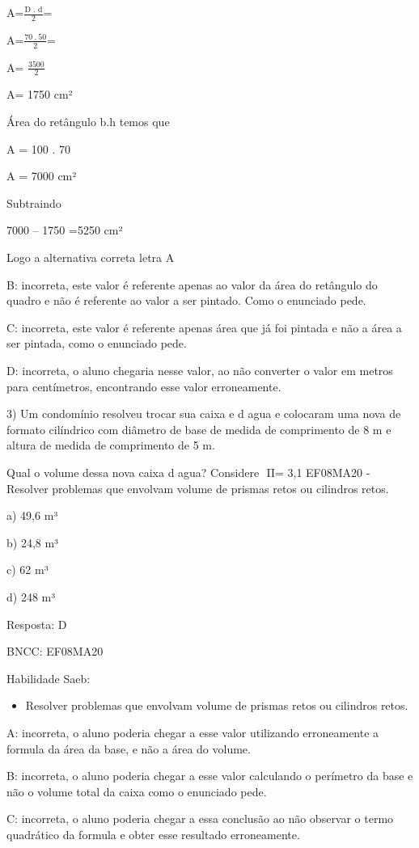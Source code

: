 A=\(\frac{\text{D\ .\ d}}{2}\)=

A=\(\frac{70\ .\ 50}{2}\)=

A= \(\frac{3500}{2}\)

A= 1750 cm²

Área do retângulo b.h temos que

A = 100 . 70

A = 7000 cm²

Subtraindo

7000 -- 1750 =5250 cm²

Logo a alternativa correta letra A

B: incorreta, este valor é referente apenas ao valor da área do
retângulo do quadro e não é referente ao valor a ser pintado. Como o
enunciado pede.

C: incorreta, este valor é referente apenas área que já foi pintada e
não a área a ser pintada, como o enunciado pede.

D: incorreta, o aluno chegaria nesse valor, ao não converter o valor em
metros para centímetros, encontrando esse valor erroneamente.

3) Um condomínio resolveu trocar sua caixa e d agua e colocaram uma nova
de formato cilíndrico com diâmetro de base de medida de comprimento de 8
m e altura de medida de comprimento de 5 m.

Qual o volume dessa nova caixa d agua? Considere \(\text{\ Π}\)= 3,1
EF08MA20 - Resolver problemas que envolvam volume de prismas retos ou
cilindros retos.

a) 49,6 m³

b) 24,8 m³

c) 62 m³

d) 248 m³

Resposta: D

BNCC: EF08MA20

Habilidade Saeb:

\begin{itemize}
\tightlist
\item
  Resolver problemas que envolvam volume de prismas retos ou cilindros
  retos.
\end{itemize}

A: incorreta, o aluno poderia chegar a esse valor utilizando
erroneamente a formula da área da base, e não a área do volume.

B: incorreta, o aluno poderia chegar a esse valor calculando o perímetro
da base e não o volume total da caixa como o enunciado pede.

C: incorreta, o aluno poderia chegar a essa conclusão ao não observar o
termo quadrático da formula e obter esse resultado erroneamente.


